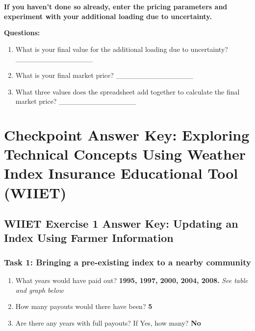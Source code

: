 \documentclass[letterpaper,10pt,english]{sphinxmanual}
\begin{document}
\textbf{If you haven't done so already, enter the pricing parameters and experiment with your additional loading due to uncertainty.}

\textbf{Questions:}
\begin{enumerate}
\item {} 
What is your final value for the additional loading due to uncertainty? \_\_\_\_\_\_\_\_\_\_\_\_\_\_\_

\item {} 
What is your final market price? \_\_\_\_\_\_\_\_\_\_\_\_\_\_\_

\item {} 
What three values does the spreadsheet add together to calculate the final market price? \_\_\_\_\_\_\_\_\_\_\_\_\_\_\_

\end{enumerate}


\section{Checkpoint Answer Key: Exploring Technical Concepts Using Weather Index Insurance Educational Tool (WIIET)}
\label{index_updated_educationalMat:checkpoint-answer-key-exploring-technical-concepts-using-weather-index-insurance-educational-tool-wiiet}

\subsection{WIIET Exercise 1 Answer Key: Updating an Index Using Farmer Information}
\label{wiiet/wiiet_usingfarmerinformationanskey:wiiet-exercise-1-answer-key-updating-an-index-using-farmer-information}\label{wiiet/wiiet_usingfarmerinformationanskey::doc}

\subsubsection{Task 1: Bringing a pre-existing index to a nearby community}
\label{wiiet/wiiet_usingfarmerinformationanskey:task-1-bringing-a-pre-existing-index-to-a-nearby-community}\begin{enumerate}
\item {} 
What years would have paid out? \textbf{1995, 1997, 2000, 2004, 2008.} \emph{See table and graph below}

\item {} 
How many payouts would there have been? \textbf{5}

\item {} 
Are there any years with full payouts? If Yes, how many? \textbf{No}

\end{enumerate}
\end{document}
